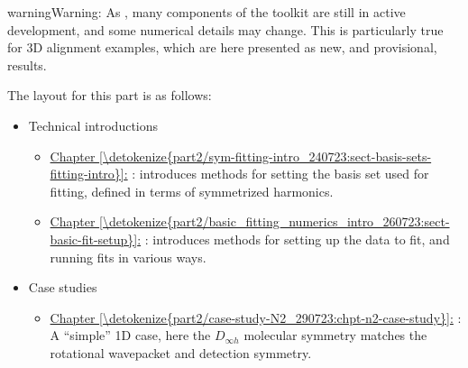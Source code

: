 \documentclass[letterpaper,table,10pt,english]{jupyterBook}
\begin{document}
\begin{sphinxShadowBox}
\sphinxstylesidebartitle{}

\begin{sphinxadmonition}{warning}{Warning:}
\sphinxAtStartPar
As {\hyperref[\detokenize{frontmatter/book_versions_note:sec-numerics-disclaimer}]{}}, many components of the toolkit are still in active development, and some numerical details may change. This is particularly true for 3D alignment examples, which are here presented as new, and provisional, results.
\end{sphinxadmonition}
\end{sphinxShadowBox}

\sphinxAtStartPar
The layout for this part is as follows:
\begin{itemize}
\item {} 
\sphinxAtStartPar
Technical introductions
\begin{itemize}
\item {} 
\sphinxAtStartPar
\hyperref[\detokenize{part2/sym-fitting-intro_240723:sect-basis-sets-fitting-intro}]{Chapter \ref{\detokenize{part2/sym-fitting-intro_240723:sect-basis-sets-fitting-intro}}:} {\hyperref[\detokenize{part2/sym-fitting-intro_240723:sect-basis-sets-fitting-intro}]{}}: introduces methods for setting the basis set used for fitting, defined in terms of symmetrized harmonics.

\item {} 
\sphinxAtStartPar
\hyperref[\detokenize{part2/basic_fitting_numerics_intro_260723:sect-basic-fit-setup}]{Chapter \ref{\detokenize{part2/basic_fitting_numerics_intro_260723:sect-basic-fit-setup}}:} {\hyperref[\detokenize{part2/basic_fitting_numerics_intro_260723:sect-basic-fit-setup}]{}}: introduces methods for setting up the data to fit, and running fits in various ways.

\end{itemize}

\item {} 
\sphinxAtStartPar
Case studies
\begin{itemize}
\item {} 
\sphinxAtStartPar
\hyperref[\detokenize{part2/case-study-N2_290723:chpt-n2-case-study}]{Chapter \ref{\detokenize{part2/case-study-N2_290723:chpt-n2-case-study}}:} {\hyperref[\detokenize{part2/case-study-N2_290723:chpt-n2-case-study}]{}}: A “simple” 1D case, here the \(D_{\infty h}\) molecular symmetry matches the rotational wavepacket and detection symmetry.


\end{itemize}
\end{itemize}
\end{document}
